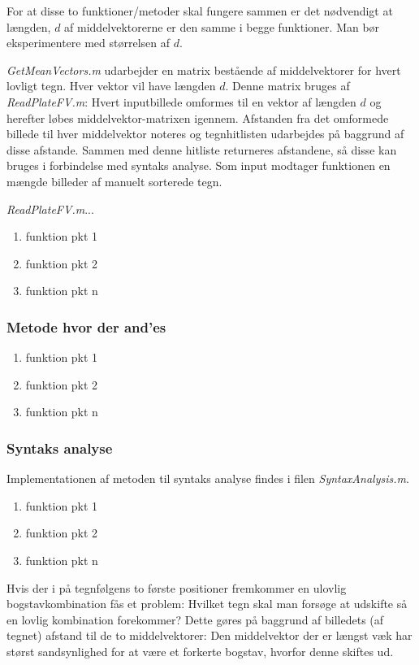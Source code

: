 For at disse to funktioner/metoder skal fungere sammen er det nødvendigt at længden, $d$ af middelvektorerne er den samme i begge funktioner. Man bør eksperimentere med størrelsen af $d$.

\textit{GetMeanVectors.m} udarbejder en matrix bestående af middelvektorer for hvert lovligt tegn. Hver vektor vil have længden $d$. Denne matrix bruges af \textit{ReadPlateFV.m}: Hvert inputbillede omformes til en vektor af længden $d$ og herefter løbes middelvektor-matrixen igennem. Afstanden fra det omformede billede til hver middelvektor noteres og tegnhitlisten udarbejdes på baggrund af disse afstande. Sammen med denne hitliste returneres afstandene, så disse kan bruges i forbindelse med syntaks analyse.
Som input modtager funktionen en mængde billeder af manuelt sorterede tegn.

\textit{ReadPlateFV.m}...

\begin{enumerate}
\item funktion pkt 1
\item funktion pkt 2
\item funktion pkt n
\end{enumerate}

\subsubsection{Metode hvor der and'es}

\begin{enumerate}
\item funktion pkt 1
\item funktion pkt 2
\item funktion pkt n
\end{enumerate}

\subsubsection{Syntaks analyse}

Implementationen af metoden til syntaks analyse findes i filen \textit{SyntaxAnalysis.m}.

\begin{enumerate}
\item funktion pkt 1
\item funktion pkt 2
\item funktion pkt n
\end{enumerate}

Hvis der i på tegnfølgens to første positioner fremkommer en ulovlig bogstavkombination fås et problem: Hvilket tegn skal man forsøge at udskifte så en lovlig kombination forekommer? Dette gøres på baggrund af billedets (af tegnet) afstand til de to middelvektorer: Den middelvektor der er længst væk har størst sandsynlighed for at være et forkerte bogstav, hvorfor denne skiftes ud.

